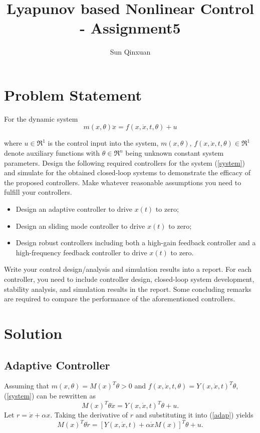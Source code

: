 \documentclass[12pt,a4paper]{article}
\title{Lyapunov based Nonlinear Control - Assignment5}
\author{Sun Qinxuan}
\begin{document}
\maketitle

\section{Problem Statement}
For the dynamic system
\begin{equation}
m(x,\theta)\ddot{x}=f(x,\dot{x},t,\theta)+u
\label{system}
\end{equation}

where $u\in {\mathfrak R}^1$ is the control input into the system, $m(x,\theta)$, $f(x,\dot{x},t,\theta)\in{\mathfrak R}^1$ denote auxiliary functions with $\theta\in{\mathfrak R}^n$ being unknown constant system parameters. Design the following required controllers for the system (\ref{system}) and simulate for the obtained closed-loop systems to demonstrate the efficacy of the proposed controllers. Make whatever reasonable assumptions you need to fulfill your controllers.

\begin{itemize}
    \item Design an adaptive controller to drive $x(t)$ to zero;
    \item Design an sliding mode controller to drive $x(t)$ to zero;
    \item Design robust controllers including both a high-gain feedback controller and a high-frequency feedback controller to drive $x(t)$ to zero.
\end{itemize}

\indent Write your control design/analysis and simulation results into a report. For each controller, you need to include controller design, closed-loop system development, stability analysis, and simulation results in the report. Some concluding remarks are required to compare the performance of the aforementioned controllers.

\section{Solution}

\indent

\subsection{Adaptive Controller}

\indent Assuming that $m(x,\theta)=M(x)^T\theta>0$ and $f(x,\dot{x},t,\theta)=Y(x,\dot{x},t)^T\theta$, (\ref{system}) can be rewritten as
\begin{equation}
M(x)^T\theta\ddot{x}=Y(x,\dot{x},t)^T\theta+u.
\label{adap}
\end{equation}
Let $r=\dot{x}+\alpha x$. Taking the derivative of $r$ and substituting it into (\ref{adap}) yields
\begin{equation}
M(x)^T\theta\dot{r}=\left[Y(x,\dot{x},t)+\alpha\dot{x}M(x)\right]^T\theta+u.
\label{adap1}
\end{equation}
\end{document}

